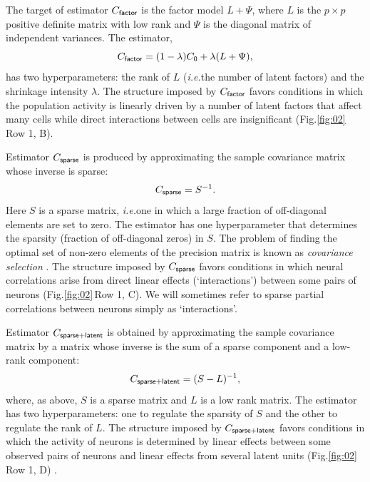 \documentclass[10pt]{article}
\newcommand{\sq}[1]{\lq#1\rq}
\newcommand{\figref}[2]{Fig.\;\ref{fig:#1}\,#2}
\newcommand{\ie}{\emph{i.e.}\;}
\begin{document}
The target of estimator $C_{\sf factor}$ is the factor model $L + \Psi$, where $L$ is the $p\times p$ positive definite matrix with low rank and $\Psi$ is the diagonal matrix of independent variances.  The estimator, 
\begin{equation}\label{eq:c-factor}
C_{\sf factor} = (1-\lambda) C_{\sf 0} + \lambda (L + \Psi),
\end{equation}
has two hyperparameters: the rank of $L$ (\ie the number of latent factors) and the shrinkage intensity $\lambda$. The structure imposed by $C_{\sf factor}$ favors conditions in which the population activity is linearly driven by a number of latent factors that affect many cells while direct interactions between cells are insignificant (\figref{02}{Row 1, B}).   

Estimator $C_{\sf sparse}$ is produced by approximating the sample covariance matrix whose inverse is sparse: 
\begin{equation}\label{eq:c-sparse}
C_{\sf sparse} = S^{-1}.
\end{equation}
Here $S$ is a sparse matrix, \ie one in which a large fraction of off-diagonal elements are set to zero.  The estimator has one hyperparameter that determines the sparsity (fraction of off-diagonal zeros) in $S$. The problem of finding the optimal set of non-zero elements of the precision matrix is known as \emph{covariance selection} \cite{Dempster:1972}. The structure imposed by $C_{\sf sparse}$ favors conditions in which neural correlations arise from direct linear effects (\sq{interactions}) between some pairs of neurons (\figref{02}{Row 1, C}).  We will sometimes refer to sparse partial correlations between neurons simply  as \sq{interactions}.


Estimator $C_{\sf sparse+latent}$ is obtained by approximating the sample covariance matrix by a matrix whose inverse is the sum of a sparse component and a low-rank component: 
\begin{equation}\label{eq:c-sl}
C_{\sf sparse+latent} = (S - L)^{-1},
\end{equation}
where, as above, $S$ is a sparse matrix and $L$ is a low rank matrix. The estimator has two hyperparameters: one to regulate the sparsity of $S$ and the other to regulate the rank of $L$. The structure imposed by $C_{\sf sparse+latent}$ favors conditions in which the activity of neurons is determined by linear effects between some observed pairs of neurons and linear effects from several latent units (\figref{02}{Row 1, D}) \cite{Chandrasekaran:2010,Ma:2013}.
\end{document}
